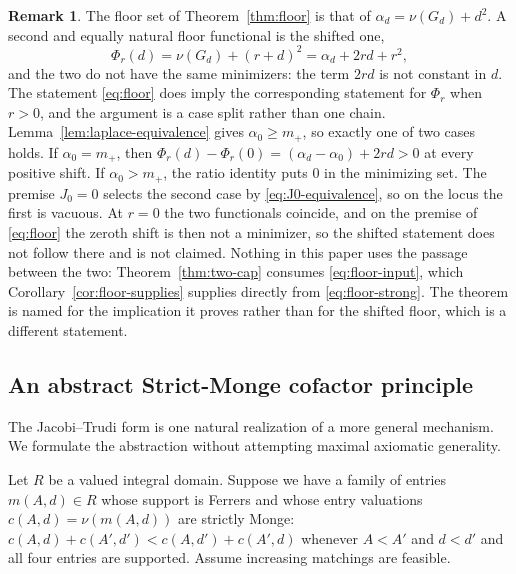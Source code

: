 \documentclass[11pt,a4paper]{amsart}
\numberwithin{equation}{section}
\theoremstyle{plain}
\theoremstyle{definition}
\newtheorem{remark}[theorem]{Remark}
\newcommand{\wt}{\nu}
\begin{document}
\begin{remark}\label{rem:which-floor}
The floor set of Theorem~\ref{thm:floor} is that of \(\alpha_d=\wt(G_d)+d^2\).  A second and equally natural floor functional is the shifted one,
\[
\Phi_r(d)=\wt(G_d)+(r+d)^2
=
\alpha_d+2rd+r^2,
\]
and the two do not have the same minimizers: the term \(2rd\) is not constant in \(d\).  The statement \eqref{eq:floor} does imply the corresponding statement for \(\Phi_r\) when \(r>0\), and the argument is a case split rather than one chain.  Lemma~\ref{lem:laplace-equivalence} gives \(\alpha_0\ge m_+\), so exactly one of two cases holds.  If \(\alpha_0=m_+\), then \(\Phi_r(d)-\Phi_r(0)=(\alpha_d-\alpha_0)+2rd>0\) at every positive shift.  If \(\alpha_0>m_+\), the ratio identity puts \(0\) in the minimizing set.  The premise \(J_0=0\) selects the second case by \eqref{eq:J0-equivalence}, so on the locus the first is vacuous.  At \(r=0\) the two functionals coincide, and on the premise of \eqref{eq:floor} the zeroth shift is then not a minimizer, so the shifted statement does not follow there and is not claimed.  Nothing in this paper uses the passage between the two: Theorem~\ref{thm:two-cap} consumes \eqref{eq:floor-input}, which Corollary~\ref{cor:floor-supplies} supplies directly from \eqref{eq:floor-strong}.  The theorem is named for the implication it proves rather than for the shifted floor, which is a different statement.
\end{remark}

\subsection{An abstract Strict-Monge cofactor principle}\label{subsec:abstract}

The Jacobi--Trudi form is one natural realization of a more general mechanism.  We formulate the abstraction without attempting maximal axiomatic generality.

Let \(R\) be a valued integral domain.  Suppose we have a family of entries \(m(A,d)\in R\) whose support is Ferrers and whose entry valuations \(c(A,d)=\nu(m(A,d))\) are strictly Monge: \(c(A,d)+c(A',d')<c(A,d')+c(A',d)\)
whenever \(A<A'\) and \(d<d'\) and all four entries are supported.  Assume increasing matchings are feasible.
\end{document}
